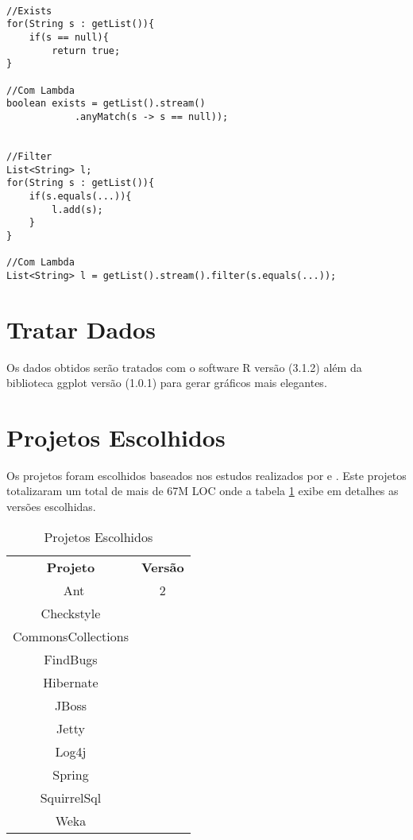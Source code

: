 \begin{lstlisting}

//Exists
for(String s : getList()){
	if(s == null){
		return true;
}

//Com Lambda
boolean exists = getList().stream()
            .anyMatch(s -> s == null));
            

//Filter
List<String> l;
for(String s : getList()){
	if(s.equals(...)){
		l.add(s);
	}
}

//Com Lambda
List<String> l = getList().stream().filter(s.equals(...));

\end{lstlisting}


\section{Tratar Dados}
Os dados obtidos serão tratados com o software R \cite{R} versão (3.1.2) além da biblioteca ggplot \cite{ggplot} versão (1.0.1) para gerar gráficos mais elegantes.


\section{Projetos Escolhidos}
Os projetos foram escolhidos baseados nos estudos realizados por \cite{Parnin:2011:JGA:1985441.1985446} e \cite{Dyer:2014:MBA:2568225.2568295}. Este projetos totalizaram um total de mais de 67M \acs{LOC} onde a tabela \ref{tab:ProjetosEscolhidos} exibe em detalhes as versões escolhidas.


\begin{table}[ht]
	\centering
	\caption{Projetos Escolhidos}
	\label{tab:ProjetosEscolhidos}
	\begin{tabular}{c|c}
		\hline \hline
		\textbf{Projeto}    &   \textbf{Versão}\\ \
	      Ant & 2 \\
	      Checkstyle &  \\
	      CommonsCollections &  \\
	      FindBugs &  \\
	      Hibernate & \\
	      JBoss & \\
	      Jetty & \\
	      Log4j & \\
	      Spring & \\
	      SquirrelSql & \\
	      Weka & \\
      \hline
    \end{tabular}
\end{table}